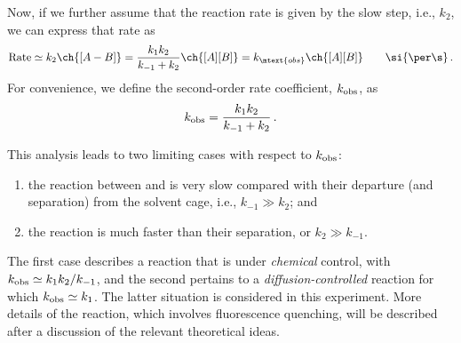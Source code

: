 Now, if we further assume that the reaction rate is given by the slow step, i.e., \( k_2 \)\ch{[A-B]}, we can express that rate as
\[
	\text{Rate} \simeq k_2 \ch{[A-B]} = \frac{k_1 k_2}{k_{-1} + k_2} \ch{[A][B]} = k_\mtext{obs}\ch{[A][B]} \qquad \si{ \per \s} \, .
\]
For convenience, we define the second-order rate coefficient, \( k_\textup{obs} \), as 
\begin{equation}
	k_\textup{obs} = \frac{k_1 k_2}{k_{-1} + k_2} \, .
	\label{eq:k_obs}
\end{equation}

This analysis leads to two limiting cases with respect to \( k_\textup{obs} \): 
\begin{enumerate}
	\item the reaction between  and  is very slow compared with their departure (and separation) from the solvent cage, i.e., \( k_{-1} \gg k_2 \); and 
	\item the  reaction is much faster than their separation, or \( k_2 \gg k_{-1} \). 
\end{enumerate}
The first case describes a reaction that is under \emph{chemical} control, with \( k_\textup{obs} \simeq k_1 k_2 / k_{-1} \), and the second pertains to a \emph{diffusion-controlled} reaction for which \( k_\textup{obs} \simeq k_1 \). 
The latter situation is considered in this experiment. More details of the reaction, which involves fluorescence quenching, will be described after a discussion of the relevant theoretical ideas. 

